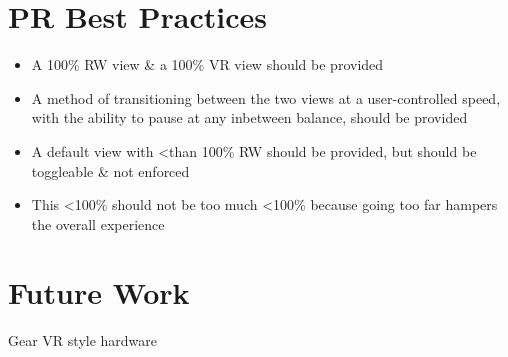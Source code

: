 \section{PR Best Practices}

\begin{itemize}
	\item A 100\% RW view \& a 100\% VR view should be provided
	\item A method of transitioning between the two views at a user-controlled speed, with the ability to pause at any inbetween balance, should be provided
	\item A default view with \textless than 100\% RW should be provided, but should be toggleable \& not enforced
	\item This \textless 100\% should not be too much \textless 100\% because going too far hampers the overall experience
\end{itemize}




\section{Future Work}

Gear VR style hardware